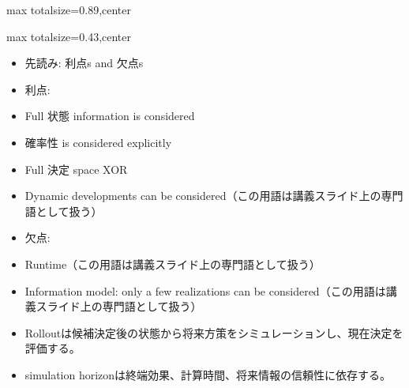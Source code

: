 \begin{minipage}[t]{0.58\textwidth}
\begin{adjustbox}{max totalsize={\textwidth}{0.89\textheight},center}
\begin{minipage}{\textwidth}
\end{minipage}
\end{adjustbox}
\end{minipage}


\clearpage
{}
\begin{minipage}[t]{0.405\textwidth}
\begin{adjustbox}{max totalsize={\textwidth}{0.43\textheight},center}
\begin{minipage}{\textwidth}\scriptsize
{}\begin{itemize}
\item 先読み: 利点s and 欠点s
\item 利点:
\item Full 状態 information is considered
\item 確率性 is considered explicitly
\item Full 決定 space XOR
\item Dynamic developments can be considered（この用語は講義スライド上の専門語として扱う）
\item 欠点:
\item Runtime（この用語は講義スライド上の専門語として扱う）
\item Information model: only a few realizations can be considered（この用語は講義スライド上の専門語として扱う）
\end{itemize}\begin{itemize}
\item Rolloutは候補決定後の状態から将来方策をシミュレーションし、現在決定を評価する。
\item simulation horizonは終端効果、計算時間、将来情報の信頼性に依存する。
\end{itemize}
\end{minipage}
\end{adjustbox}
\end{minipage}\hfill
